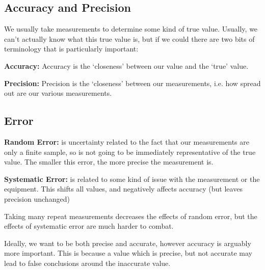 \graphicspath{{figures/}}

\subsection*{Accuracy and Precision}
We usually take measurements to determine some kind of true value. Usually, we can't actually know what this true value is, but if we could there are two bits of terminology that is particularly important:

    \textbf{Accuracy:}
    Accuracy is the `closeness' between our value and the `true' value.

    \textbf{Precision:}
    Precision is the `closeness' between our measurements, i.e. how spread out are our various measurements.


\subsection*{Error}
\textbf{Random Error:} is uncertainty related to the fact that our measurements are only a finite sample, so is not going to be immediately representative of the true value. The smaller this error, the more precise the measurement is.

\textbf{Systematic Error:} is related to some kind of issue with the measurement or the equipment. This shifts all values, and negatively affects accuracy (but leaves precision unchanged)

Taking many repeat measurements decreases the effects of random error, but the effects of systematic error are much harder to combat.

Ideally, we want to be both precise and accurate, however accuracy is arguably more important. This is because a value which is precise, but not accurate may lead to false conclusions around the inaccurate value.
